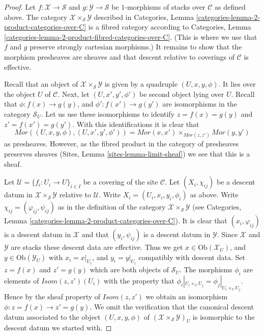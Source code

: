 \begin{proof}
Let $f : \mathcal{X} \to \mathcal{S}$ and
$g : \mathcal{Y} \to \mathcal{S}$ be
$1$-morphisms of stacks over $\mathcal{C}$
as defined above. The category
$\mathcal{X} \times_{\mathcal{S}} \mathcal{Y}$
described in
Categories, Lemma \ref{categories-lemma-2-product-categories-over-C} is a
fibred category according to
Categories, Lemma \ref{categories-lemma-2-product-fibred-categories-over-C}.
(This is where we use that $f$ and $g$ preserve strongly cartesian
morphisms.) It remains to show that the morphism presheaves are sheaves
and that descent relative to coverings of $\mathcal{C}$ is effective.

\medskip\noindent
Recall that an object of $\mathcal{X} \times_{\mathcal{S}} \mathcal{Y}$
is given by a quadruple $(U, x, y, \phi)$.
It lies over the object
$U$ of $\mathcal{C}$. Next, let $(U, x', y', \phi')$ be second
object lying over $U$.
Recall that $\phi : f(x) \to g(y)$, and $\phi' : f(x') \to g(y')$
are isomorphisms in the category $\mathcal{S}_U$. Let us
use these isomorphisms to identify $z = f(x) = g(y)$ and
$z' = f(x') = g(y')$. With this identifications
it is clear that
$$
\mathit{Mor}((U, x, y, \phi), (U, x', y', \phi'))
=
\mathit{Mor}(x, x')
\times_{\mathit{Mor}(z, z')}
\mathit{Mor}(y, y')
$$
as presheaves. However, as the fibred product in the category of
presheaves preserves sheaves (Sites, Lemma \ref{sites-lemma-limit-sheaf})
we see that this is a sheaf.

\medskip\noindent
Let $\mathcal{U} = \{f_i : U_i \to U\}_{i \in I}$ be a covering of the site
$\mathcal{C}$. Let $(X_i, \chi_{ij})$ be a descent datum
in $\mathcal{X} \times_{\mathcal{S}} \mathcal{Y}$ relative to $\mathcal{U}$.
Write $X_i = (U_i, x_i, y_i, \phi_i)$ as above. Write
$\chi_{ij} = (\varphi_{ij}, \psi_{ij})$ as in the definition of
the category $\mathcal{X} \times_{\mathcal{S}} \mathcal{Y}$ (see
Categories, Lemma \ref{categories-lemma-2-product-categories-over-C}).
It is clear that $(x_i, \varphi_{ij})$ is a descent datum in
$\mathcal{X}$ and that $(y_i, \psi_{ij})$ is a descent datum in 
$\mathcal{Y}$. Since $\mathcal{X}$ and $\mathcal{Y}$ are stacks these
descent data are effective. Thus we get
$x \in \text{Ob}(\mathcal{X}_U)$, and $y \in \text{Ob}(\mathcal{Y}_U)$
with $x_i = x|_{U_i}$, and $y_i = y|_{U_i}$ compatibly with descent data.
Set $z = f(x)$ and $z' = g(y)$ which are both objects of $\mathcal{S}_U$.
The morphisms $\phi_i$ are elements of
$\mathit{Isom}(z, z')(U_i)$ with the property that
$\phi_i|_{U_i \times_U U_j} = \phi_j|_{U_i \times_U U_j}$.
Hence by the sheaf property of $\mathit{Isom}(z, z')$
we obtain an isomorphism $\phi : z = f(x) \to z' = g(y)$.
We omit the verification that the canonical descent datum associated to
the object $(U, x, y, \phi)$ of
$(\mathcal{X} \times_{\mathcal{S}} \mathcal{Y})_U$ is isomorphic
to the descent datum we started with.
\end{proof}

